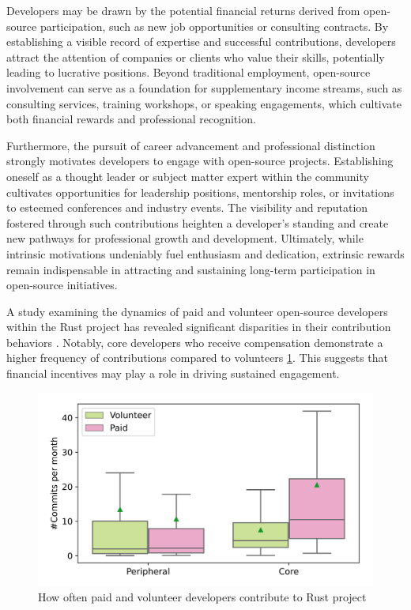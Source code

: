 Developers may be drawn by the potential financial returns derived from open-source participation, such as new job opportunities or consulting contracts. By establishing a visible record of expertise and successful contributions, developers attract the attention of companies or clients who value their skills, potentially leading to lucrative positions. Beyond traditional employment, open-source involvement can serve as a foundation for supplementary income streams, such as consulting services, training workshops, or speaking engagements, which cultivate both financial rewards and professional recognition.

Furthermore, the pursuit of career advancement and professional distinction strongly motivates developers to engage with open-source projects. Establishing oneself as a thought leader or subject matter expert within the community cultivates opportunities for leadership positions, mentorship roles, or invitations to esteemed conferences and industry events.  The visibility and reputation fostered through such contributions heighten a developer's standing and create new pathways for professional growth and development.  Ultimately, while intrinsic motivations undeniably fuel enthusiasm and dedication,  extrinsic rewards remain indispensable in attracting and sustaining long-term participation in open-source initiatives.

A study examining the dynamics of paid and volunteer open-source developers within the Rust project has revealed significant disparities in their contribution behaviors \cite{08zhang2024paid}. Notably, core developers who receive compensation demonstrate a higher frequency of contributions compared to volunteers \ref{fig:contribution_frequency}. This suggests that financial incentives may play a role in driving sustained engagement.

\begin{figure}[ht]
    \centering
    \includegraphics[width=0.65\linewidth]{figs/Contribution_frequency.png}
    \caption{How often paid and volunteer developers contribute to Rust project \cite{08zhang2024paid}}
    \label{fig:contribution_frequency}
\end{figure}


